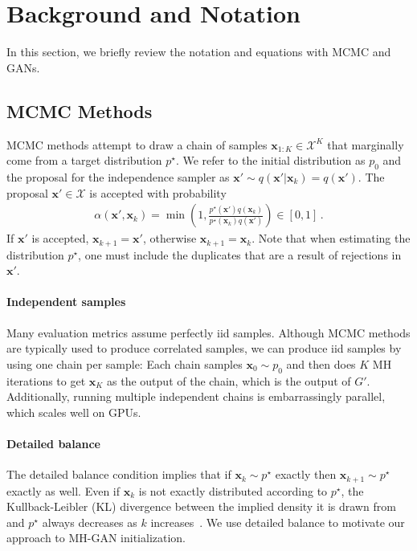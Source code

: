 \documentclass{article}
\renewcommand{\vec}[1]{{\boldsymbol{\mathbf{#1}}}} %
\newcommand{\set}[1]{\mathcal{#1}}
\newcommand{\sample}{\sim}
\newcommand{\given}{|}
\newcommand{\target}{{p^\star}}
\newcommand{\prop}{q}
\newcommand{\pinit}{{p_0}}
\newcommand{\accept}{\alpha}
\newcommand{\setx}{\set{X}}
\begin{document}
\section{Background and Notation}
\label{sec:Background}

In this section, we briefly review the notation and equations with MCMC and GANs.

\subsection{MCMC Methods}
\label{sec:MCMC Methods}

MCMC methods attempt to draw a chain of samples $\vec x_{1:K} \in \setx^K$ that marginally come from a target distribution $\target$.
We refer to the initial distribution as $\pinit$ and the proposal for the independence sampler as $\vec x' \sample \prop(\vec x' \given \vec x_k)=\prop(\vec x')$.
The proposal $\vec x' \in \setx$ is accepted with probability
\begin{align}
  \accept(\vec x', \vec x_k) = \min\left(1, \frac{\target(\vec x')\prop(\vec x_k)}{\target(\vec x_k)\prop(\vec x')}\right) \in [0,1]\,. \label{eq:alpha def}
\end{align}
If $\vec x'$ is accepted, $\vec x_{k+1} = \vec x'$, otherwise $\vec x_{k+1} = \vec x_k$.
Note that when estimating the distribution $\target$, one must include the duplicates that are a result of rejections in $\vec x'$.

\paragraph{Independent samples}
Many evaluation metrics assume perfectly iid samples.
Although MCMC methods are typically used to produce correlated samples, we can produce iid samples by using one chain per sample:
Each chain samples $\vec x_0 \sample \pinit$ and then does $K$ MH iterations to get $\vec x_K$ as the output of the chain, which is the output of $G'$.
Additionally, running multiple independent chains is embarrassingly parallel, which scales well on GPUs.

\paragraph{Detailed balance}
The detailed balance condition implies that if $\vec x_k \sample \target$ exactly then $\vec x_{k+1} \sample \target$ exactly as well.
Even if $\vec x_k$ is not exactly distributed according to $\target$, the Kullback-Leibler (KL) divergence between the implied density it is drawn from and $\target$ always decreases as $k$ increases~\citep{Murray2008}.
We use detailed balance to motivate our approach to MH-GAN initialization.
\end{document}
